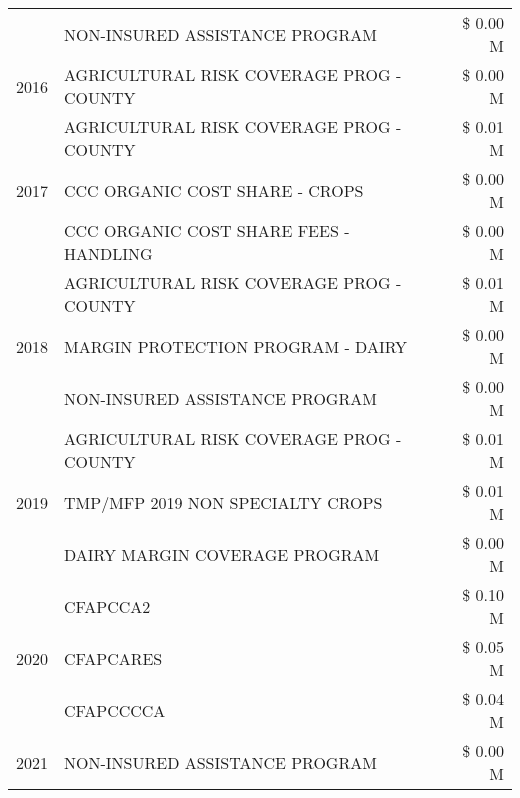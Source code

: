 \begin{tabular}{llr}
 & NON-INSURED ASSISTANCE PROGRAM & \$ 0.00 M \\
\cline{1-3}
2016 & AGRICULTURAL RISK COVERAGE PROG - COUNTY & \$ 0.00 M \\
\cline{1-3}
\multirow[t]{3}{*}{2017} & AGRICULTURAL RISK COVERAGE PROG - COUNTY & \$ 0.01 M \\
 & CCC ORGANIC COST SHARE - CROPS & \$ 0.00 M \\
 & CCC ORGANIC COST SHARE FEES - HANDLING & \$ 0.00 M \\
\cline{1-3}
\multirow[t]{3}{*}{2018} & AGRICULTURAL RISK COVERAGE PROG - COUNTY & \$ 0.01 M \\
 & MARGIN PROTECTION PROGRAM - DAIRY & \$ 0.00 M \\
 & NON-INSURED ASSISTANCE PROGRAM & \$ 0.00 M \\
\cline{1-3}
\multirow[t]{3}{*}{2019} & AGRICULTURAL RISK COVERAGE PROG - COUNTY & \$ 0.01 M \\
 & TMP/MFP 2019 NON SPECIALTY CROPS & \$ 0.01 M \\
 & DAIRY MARGIN COVERAGE PROGRAM & \$ 0.00 M \\
\cline{1-3}
\multirow[t]{3}{*}{2020} & CFAPCCA2 & \$ 0.10 M \\
 & CFAPCARES & \$ 0.05 M \\
 & CFAPCCCCA & \$ 0.04 M \\
\cline{1-3}
2021 & NON-INSURED ASSISTANCE PROGRAM & \$ 0.00 M \\
\cline{1-3}
\bottomrule
\end{tabular}
